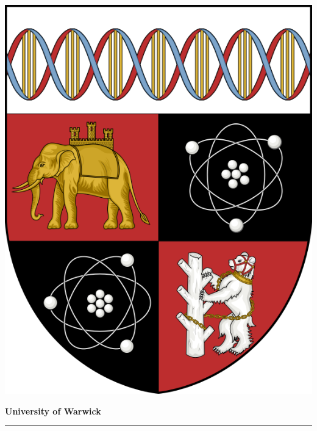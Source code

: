 
\begin{titlepage}
\centering

\vspace*{2cm} %

\begin{minipage}{0.9\textwidth}
\centering

\includegraphics[scale=0.2]{Figures/logo/university_crest.png}

\vspace{0.5cm}
\begin{Large}
    \textbf{University of Warwick}
\end{Large}

\vspace{1em}
\noindent\rule{13cm}{1pt}

\vspace{1em}

{\makeatletter
\largetitlestyle\fontsize{16}{16}\selectfont\@title
\makeatother}


\end{minipage}
\end{titlepage}
